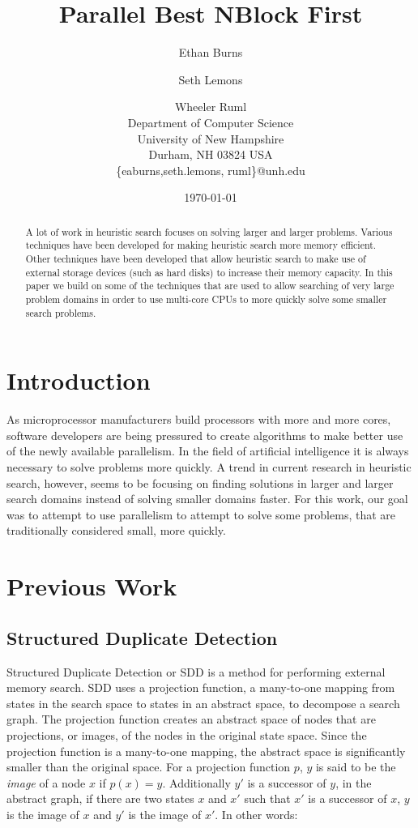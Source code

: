 \documentclass{article} \usepackage{aaai} \usepackage{graphicx}
\title{Parallel Best NBlock First}
\author{Ethan Burns \and Seth Lemons \and Wheeler Ruml \\
Department of Computer Science \\
University of New Hampshire \\
Durham, NH 03824 USA \\
\{eaburns,seth.lemons, ruml\}@unh.edu}
\date{\today}
\begin{document}
\maketitle

\begin{abstract}
A lot of work in heuristic search focuses on solving larger and larger
problems.  Various techniques have been developed for making heuristic
search more memory efficient.  Other techniques have been developed
that allow heuristic search to make use of external storage devices
(such as hard disks) to increase their memory capacity.  In this paper
we build on some of the techniques that are used to allow searching of
very large problem domains in order to use multi-core CPUs to more
quickly solve some smaller search problems.
\end{abstract}

\section{Introduction}

As microprocessor manufacturers build processors with more and more
cores, software developers are being pressured to create algorithms to
make better use of the newly available parallelism.  In the field of
artificial intelligence it is always necessary to solve problems more
quickly.  A trend in current research in heuristic search, however,
seems to be focusing on finding solutions in larger and larger search
domains instead of solving smaller domains faster.  For this work, our
goal was to attempt to use parallelism to attempt to solve some
problems, that are traditionally considered small, more quickly.

\section{Previous Work}

\subsection{Structured Duplicate Detection}

Structured Duplicate Detection or SDD \cite{zhou:sdd} is a method for
performing external memory search.  SDD uses a projection function, a
many-to-one mapping from states in the search space to states in an
abstract space, to decompose a search graph.  The projection function
creates an abstract space of nodes that are projections, or images, of
the nodes in the original state space.  Since the projection function
is a many-to-one mapping, the abstract space is significantly smaller
than the original space.  For a projection function $p$, $y$ is said
to be the \emph{image} of a node $x$ if $p(x) = y$.  Additionally $y'$
is a successor of $y$, in the abstract graph, if there are two states
$x$ and $x'$ such that $x'$ is a successor of $x$, $y$ is the image of
$x$ and $y'$ is the image of $x'$.  In other words:
\end{document}
